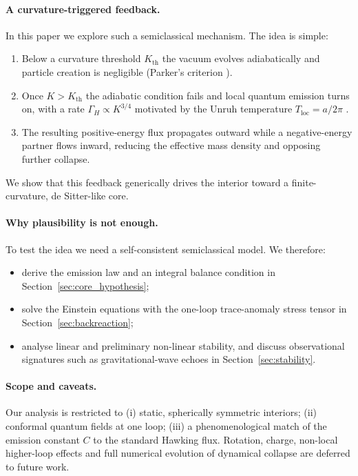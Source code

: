\paragraph*{A curvature-triggered feedback.}
In this paper we explore such a semiclassical mechanism. The idea is simple:
\begin{enumerate}[leftmargin=1.1em,label=(\arabic*)]
  \item Below a curvature threshold \(K_{\mathrm{th}}\) the vacuum evolves adiabatically and particle creation is negligible (Parker's criterion \cite{parker1968}).
  \item Once \(K\!>\!K_{\mathrm{th}}\) the adiabatic condition fails and local quantum emission turns on, with a rate \(\Gamma_H\propto K^{3/4}\) motivated by the Unruh temperature \(T_{\mathrm{loc}}=a/2\pi\) \cite{Unruh1976}.
  \item The resulting positive-energy flux propagates outward while a negative-energy partner flows inward, reducing the effective mass density and opposing further collapse.
\end{enumerate}
We show that this feedback generically drives the interior toward a finite-curvature, de Sitter-like core.

\vspace{4pt}
\paragraph*{Why plausibility is not enough.}
To test the idea we need a self-consistent semiclassical model.
We therefore:
\begin{itemize}[leftmargin=*]
  \item derive the emission law and an integral balance condition in Section~\ref{sec:core_hypothesis};
  \item solve the Einstein equations with the one-loop trace-anomaly stress tensor in Section~\ref{sec:backreaction};
  \item analyse linear and preliminary non-linear stability, and discuss observational signatures such as gravitational-wave echoes \cite{CarballoRubio2018,Cardoso2016Echoes} in Section~\ref{sec:stability}.
\end{itemize}

\vspace{4pt}
\paragraph*{Scope and caveats.}
Our analysis is restricted to (i) static, spherically symmetric interiors; (ii) conformal quantum fields at one loop; (iii) a phenomenological match of the emission constant \(C\) to the standard Hawking flux. Rotation, charge, non-local higher-loop effects and full numerical evolution of dynamical collapse are deferred to future work.

